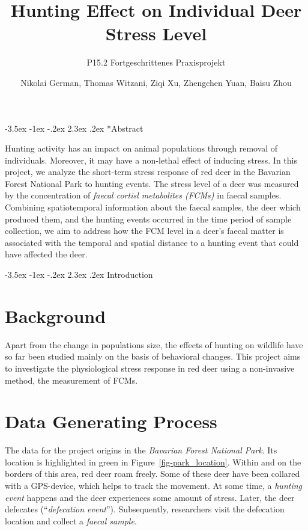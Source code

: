 \documentclass[
  letterpaper,
  DIV=11,
  numbers=noendperiod,
  twocolumn,
  open=any]{scrreprt}
\title{Hunting Effect on Individual Deer Stress Level}
\subtitle{P15.2 Fortgeschrittenes Praxisprojekt}
\author{Nikolai German, Thomas Witzani, Ziqi Xu, Zhengchen Yuan, Baisu
Zhou}
\date{}
\makeatletter
\renewcommand\chapter{\@startsection{chapter}{0}{\z@}%
  {-3.5ex \@plus -1ex \@minus -.2ex}%
  {2.3ex \@plus.2ex}%
  {\normalfont\Large\bfseries}}
\renewcommand*\contentsname{Table of contents}
\newcommand\contentsname{Table of contents}
\makeatother
\begin{document}
\maketitle

\renewcommand*\contentsname{Table of contents}
{
\hypersetup{linkcolor=}
\setcounter{tocdepth}{2}
\tableofcontents
}

\chapter*{Abstract}

Hunting activity has an impact on animal populations through removal of
individuals. Moreover, it may have a non-lethal effect of inducing
stress. In this project, we analyze the short-term stress response of
red deer in the Bavarian Forest National Park to hunting events. The
stress level of a deer was measured by the concentration of \emph{faecal
cortisl metabolites (FCMs)} in faecal samples. Combining spatiotemporal
information about the faecal samples, the deer which produced them, and
the hunting events occurred in the time period of sample collection, we
aim to address how the FCM level in a deer's faecal matter is associated
with the temporal and spatial distance to a hunting event that could
have affected the deer.

\chapter{Introduction}\label{introduction}

\section{Background}\label{background}

Apart from the change in populations size, the effects of hunting on
wildlife have so far been studied mainly on the basis of behavioral
changes. This project aims to investigate the physiological stress
response in red deer using a non-invasive method, the measurement of
FCMs.

\section{Data Generating Process}\label{data-generating-process}

The data for the project origins in the \emph{Bavarian Forest National
Park}. Its location is highlighted in green in
Figure~\ref{fig-park_location}. Within and on the borders of this area,
red deer roam freely. Some of these deer have been collared with a
GPS-device, which helps to track the movement. At some time, a
\emph{hunting event} happens and the deer experiences some amount of
stress. Later, the deer defecates (``\emph{defecation event}'').
Subsequently, researchers visit the defecation location and collect a
\emph{faecal sample}.
\end{document}
